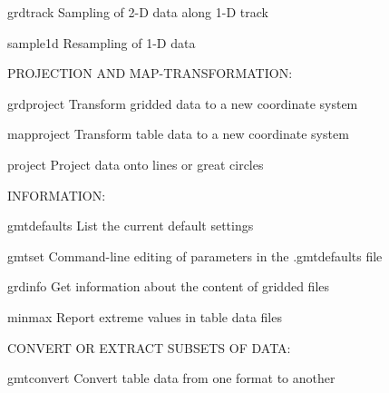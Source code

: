 \documentclass{article}
\begin{document}
\par 	grdtrack	Sampling of 2-D data along 1-D track\par 

\par 	sample1d	Resampling of 1-D data\par 

\par \par 

\par PROJECTION AND MAP-TRANSFORMATION:\par 

\par 	grdproject	Transform gridded data to a new coordinate system\par 

\par 	mapproject	Transform table data to a new coordinate system\par 

\par 	project	Project data onto lines or great circles\par 

\par \par 

\par INFORMATION:\par 

\par 	gmtdefaults	List the current default settings\par 

\par 	gmtset	Command-line editing of parameters in the .gmtdefaults file\par 

\par 	grdinfo	Get information about the content of gridded files\par 

\par 	minmax	Report extreme values in table data files\par 

\par \par 

\par CONVERT OR EXTRACT SUBSETS OF DATA:\par 

\par 	gmtconvert	Convert table data from one format to another\par 
\end{document}

